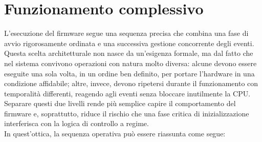 \documentclass[11pt]{report}
\begin{document}
	\section{Funzionamento complessivo}
	L'esecuzione del firmware segue una sequenza precisa che combina una fase di avvio rigorosamente ordinata e una successiva gestione concorrente degli eventi. Questa scelta architetturale non nasce da un'esigenza formale, ma dal fatto che nel sistema convivono operazioni con natura molto diversa: alcune devono essere eseguite una sola volta, in un ordine ben definito, per portare l'hardware in una condizione affidabile; altre, invece, devono ripetersi durante il funzionamento con temporalità differenti, reagendo agli eventi senza bloccare inutilmente la CPU. Separare questi due livelli rende più semplice capire il comportamento del firmware e, soprattutto, riduce il rischio che una fase critica di inizializzazione interferisca con la logica di controllo a regime.\\
	In quest'ottica, la sequenza operativa può essere riassunta come segue:
\end{document}
